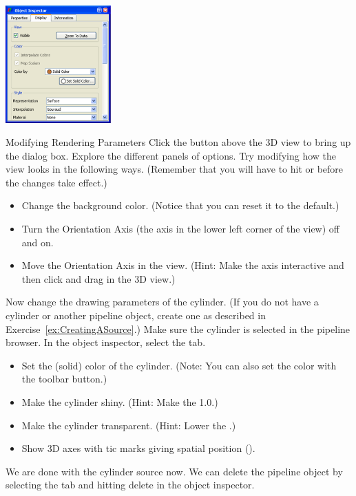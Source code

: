 \begin{inlinefig}
  \includegraphics[width=1.6in]{images/DisplayTab}
\end{inlinefig}

\begin{exercise}{Modifying Rendering Parameters}
  \label{ex:ModifyingRenderingParameters}
  Click the  button above the 3D view to bring up the
   dialog box.  Explore the different panels of
  options.  Try modifying how the view looks in the following ways.
  (Remember that you will have to hit  or  before the
  changes take effect.)

  \begin{itemize}
  \item Change the background color.  (Notice that you can reset it to the
    default.)
  \item Turn the Orientation Axis (the axis in the lower left corner of the
    view) off and on.
  \item Move the Orientation Axis in the view.  (Hint: Make the axis
    interactive and then click and drag in the 3D view.)
  \end{itemize}

  Now change the drawing parameters of the cylinder.  (If you do not have a
  cylinder or another pipeline object, create one as described in
  Exercise~\ref{ex:CreatingASource}.)  Make sure the cylinder is selected
  in the pipeline browser.  In the object inspector, select the
   tab.

  \begin{itemize}
  \item Set the (solid) color of the cylinder.  (Note: You can also set the
    color with the  toolbar button.)
  \item Make the cylinder shiny.  (Hint: Make the 
    1.0.)
  \item Make the cylinder transparent.  (Hint: Lower the .)
  \item Show 3D axes with tic marks giving spatial position ().
  \end{itemize}

  We are done with the cylinder source now.  We can delete the pipeline
  object by selecting the  tab and hitting delete \delete
  in the object inspector.
\end{exercise}


